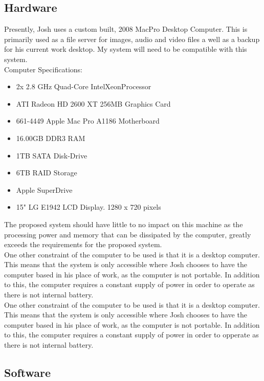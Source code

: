 \subsection{Hardware}

Presently, Josh uses a custom built, 2008 MacPro Desktop Computer. This is primarily used as a file server for images, audio and video files a well as a backup for his current work desktop. My system will need to be compatible with this system.\\

\noindent Computer Specifications:
\begin{itemize}
    \item 2x 2.8 GHz Quad-Core Intel\textregistered Xeon\texttrademark Processor
    \item ATI Radeon HD 2600 XT 256MB Graphics Card
    \item 661-4449 Apple Mac Pro A1186 Motherboard
    \item 16.00GB DDR3 RAM
    \item 1TB SATA Disk-Drive
    \item 6TB RAID Storage
    \item Apple SuperDrive
    \item 15" LG E1942 LCD Display. 1280 x 720 pixels
\end{itemize}

\noindent The proposed system should have little to no impact on this machine as the processing power and memory that can be dissipated by the computer, greatly exceeds the requirements for the proposed system.\\

\noindent One other constraint of the computer to be used is that it is a desktop computer. This means that the system is only accessible where Josh chooses to have the computer based in his place of work, as the computer is not portable. In addition to this, the computer requires a constant supply of power in order to operate as there is not internal battery.\\

\noindent One other constraint of the computer to be used is that it is a desktop computer. This means that the system is only accessible where Josh chooses to have the computer based in his place of work, as the computer is not portable. In addition to this, the computer requires a constant supply of power in order to opperate as there is not internal battery.\\

\subsection{Software}

